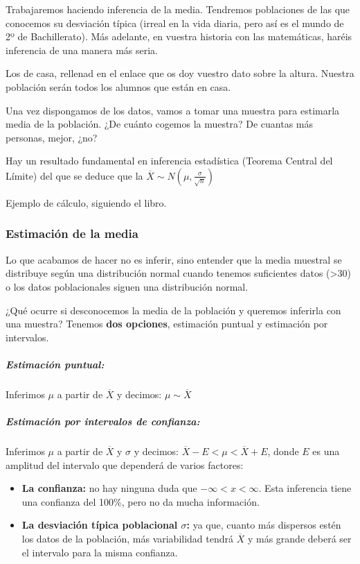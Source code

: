 Trabajaremos haciendo inferencia de la media. 
%
Tendremos poblaciones de las que conocemos su desviación típica (irreal en la vida diaria, pero así es el mundo de 2º de Bachillerato). Más adelante, en vuestra historia con las matemáticas, haréis inferencia de una manera más seria.

\begin{example}
Los de casa, rellenad en el enlace que os doy vuestro dato sobre la altura. Nuestra población serán todos los alumnos que están en casa. 

Una vez dispongamos de los datos, vamos a tomar una muestra para estimarla media de la población. ¿De cuánto cogemos la muestra? De cuantas más personas, mejor, ¿no?

 Hay un resultado fundamental en inferencia estadística (Teorema Central del Límite) del que se deduce que la  $\overline{X} \sim N\left(\mu,\frac{\sigma}{\sqrt{n}}\right)$
\end{example}

\begin{example}
Ejemplo de cálculo, siguiendo el libro.
\end{example}

\subsubsection{Estimación de la media}
Lo que acabamos de hacer no es inferir, sino entender que la media muestral se distribuye según una distribución normal cuando tenemos suficientes datos (>30) o los datos poblacionales siguen una distribución normal. 

¿Qué ocurre si desconocemos la media de la población y queremos inferirla con una muestra?
%
Tenemos \textbf{dos opciones}, estimación puntual y estimación por intervalos.

\subparagraph{Estimación puntual: } Inferimos $\mu$ a partir de $\overline{X}$ y decimos: $\mu \sim \overline{X}$

\subparagraph{Estimación por intervalos de confianza: } Inferimos $\mu$ a partir de $\overline{X}$ y $\sigma$ y decimos: $\overline{X} - E < \mu < \overline{X} + E$, donde $E$ es una amplitud del intervalo que dependerá de varios factores:
\begin{itemize}
    \item \textbf{La confianza:} no hay ninguna duda que $-\infty<x<\infty$. Esta inferencia tiene una confianza del 100\%, pero no da mucha información. 
    \item \textbf{La desviación típica poblacional $\sigma$:} ya que, cuanto más dispersos estén los datos de la población, más variabilidad tendrá $\overline{X}$ y más grande deberá ser el intervalo para la misma confianza.
\end{itemize}

